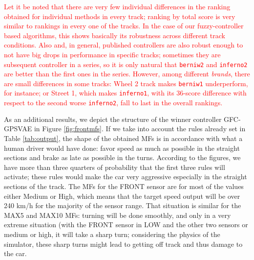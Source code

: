 \documentclass[10pt,journal,compsoc]{IEEEtran}
\begin{document}
\textcolor{red}{Let it be noted that there are very few individual
  differences in the ranking obtained for individual methods in every
  track; ranking by total score is very similar to rankings in every
  one of the tracks. In the case of our fuzzy-controller based
  algorithms, this shows basically its robustness across different
  track conditions. Also and, in general, published controllers are also robust
  enough to not have big drops in performance in specific
  tracks; sometimes they are subsequent controller in a series, so
  it is only natural that {\tt berniw2} and {\tt inferno2} are better
  than the first ones in the series. However, among different {\em
    brands}, there are small differences in some tracks: {\sf
    Wheel 2} track makes {\tt berniw1} underperform, for instance; or
  {\sf Street 1}, which makes {\tt inferno1}, with its 36-score
  difference with respect to the second worse {\tt inferno2}, fall to
  last in the overall rankings.}


As an additional results, we depict the structure of the winner controller {\sf GFC-GPSVAE} in Figure \ref{fig:frontmfs}. 
If we take into account the rules already set in Table
\ref{tab:output}, the shape of the obtained MFs  is in accordance with
what a human driver would have done: favor speed as much as possible
in the straight sections and brake as late as possible in the turns. 
According to the figures, we have more than three quarters of
probability that the first three rules will activate; these rules
would make the car very aggressive especially in the straight sections
of the track. The MFs for the FRONT sensor are for most of the values
either Medium or High, which means that the target speed output will
be over 240 km/h for the majority of the sensor range. 
That situation is similar for the MAX5 and MAX10 MFs: turning will be done smoothly, and only in a very extreme situation (with the FRONT sensor in LOW and
the other two sensors or medium or high, it will take a sharp turn;
considering the physics of the simulator, these sharp turns might lead
to getting off track and thus damage to the car.
\end{document}
